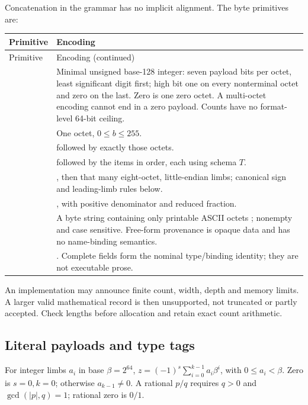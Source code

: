 Concatenation in the grammar has no implicit alignment. The byte primitives are:
\begin{longtable}{@{}P{.22\linewidth}P{.73\linewidth}@{}}
\toprule Primitive & Encoding\\\midrule\endfirsthead
\toprule Primitive & Encoding (continued)\\\midrule\endhead
\bottomrule\endfoot
{} & Minimal unsigned base-128 integer: seven payload bits per octet,
least significant digit first; high bit one on every nonterminal octet and zero
on the last. Zero is one zero octet. A multi-octet encoding cannot end in a zero
payload. Counts have no format-level 64-bit ceiling.\\
 & One octet, $0\le b\le255$.\\
 &  followed by exactly those octets.\\
 &  followed by the items in order, each using
schema $T$.\\
 & , then that many eight-octet,
little-endian limbs; canonical sign and leading-limb rules below.\\
 & , with positive denominator and
reduced fraction.\\
 & A  byte string containing only printable ASCII octets
; nonempty and case sensitive. Free-form provenance is opaque
 data and has no name-binding semantics.\\
 & .
Complete fields form the nominal type/binding identity; they are not executable prose.\\
\end{longtable}
An implementation may announce finite count, width, depth and memory limits.
A larger valid mathematical record is then unsupported, not truncated or partly
accepted. Check lengths before allocation and retain exact count arithmetic.

\subsection{Literal payloads and type tags}
For integer limbs $a_i$ in base $\beta=2^{64}$,
$z=(-1)^s\sum_{i=0}^{k-1}a_i\beta^i$, with $0\le a_i<\beta$.
Zero is $s=0,k=0$; otherwise $a_{k-1}\ne0$. A rational $p/q$ requires
$q>0$ and $\gcd(|p|,q)=1$; rational zero is $0/1$.

